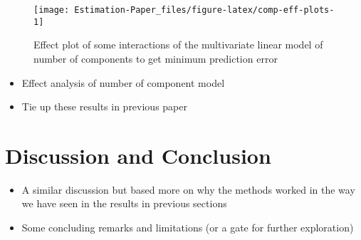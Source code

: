 \documentclass[12pt,3p,authoryear]{elsarticle}
\providecommand{\tightlist}{%
  \setlength{\itemsep}{0pt}\setlength{\parskip}{0pt}}
\begin{document}
\begin{figure}[!htb]
\texttt{[image: Estimation-Paper\_files/figure-latex/comp-eff-plots-1]} \caption{Effect plot of some interactions of the multivariate
linear model of number of components to get minimum prediction error}\label{fig:comp-eff-plots}
\end{figure}

\begin{itemize}
\tightlist
\item
  Effect analysis of number of component model
\item
  Tie up these results in previous paper
\end{itemize}

\section{Discussion and Conclusion}\label{discussion-and-conclusion}

\begin{itemize}
\tightlist
\item
  A similar discussion but based more on why the methods worked in the
  way we have seen in the results in previous sections
\item
  Some concluding remarks and limitations (or a gate for further
  exploration)
\end{itemize}

\hypertarget{refs}{}


\renewcommand\refname{References}

\end{document}
